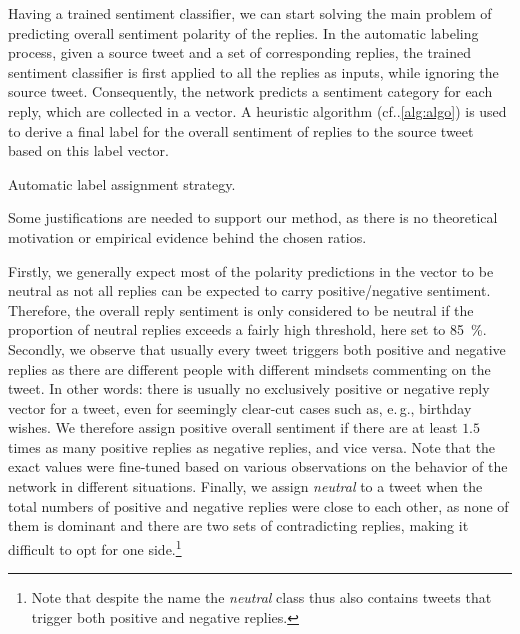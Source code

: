 \documentclass[conference]{IEEEtran}
\makeatletter
\DeclareRobustCommand\onedot{\futurelet\@let@token\@onedot}
\def\@onedot{\ifx\@let@token.\else.\null\fi\xspace}
\newcommand{\eg}{e.\,g.,\xspace}
\newcommand{\cf}{cf\onedot}
\makeatother
\begin{document}
Having a trained sentiment classifier, we can start solving the main problem of predicting overall sentiment polarity of the replies.
In the automatic labeling process, given a source tweet and a set of corresponding replies, the trained sentiment classifier is first applied to all the replies as inputs, while ignoring the source tweet. Consequently, the network predicts a sentiment category for each reply, which are collected in a vector.
A heuristic algorithm (\cf\cref{alg:algo}) is used to derive a final label for the overall sentiment of replies to the source tweet based on this label vector.
\begin{algorithm}[t]
\caption{Automatic label assignment strategy.}
\label{alg:algo}
\end{algorithm}
Some justifications are needed to support our method, as there is no theoretical motivation or empirical evidence behind the chosen ratios. 

Firstly, we generally expect most of the polarity predictions in the vector to be neutral as not all replies can be expected to carry positive/negative sentiment. Therefore, the overall reply sentiment is only considered to be neutral if the proportion of neutral replies exceeds a fairly high threshold, here set to \SI{85}{\percent}.
Secondly, we observe that usually
every tweet triggers both positive and negative replies as there are different people with different mindsets commenting on the tweet. In other words: there is usually no exclusively positive or negative reply vector for a tweet, even for seemingly clear-cut cases such as, \eg birthday wishes. We therefore assign positive overall sentiment if there are at least $1.5$ times as many positive replies as negative replies, and vice versa.
Note that the exact values were fine-tuned based on various observations on the behavior of the network in different situations.
Finally, we assign \emph{neutral} to a tweet when the total numbers of positive and negative replies were close to each other, as none of them is dominant and there are two sets of contradicting replies, making it difficult to opt for one side.\footnote{Note that despite the name the \emph{neutral} class thus also contains tweets that trigger both positive and negative replies.}
\end{document}
